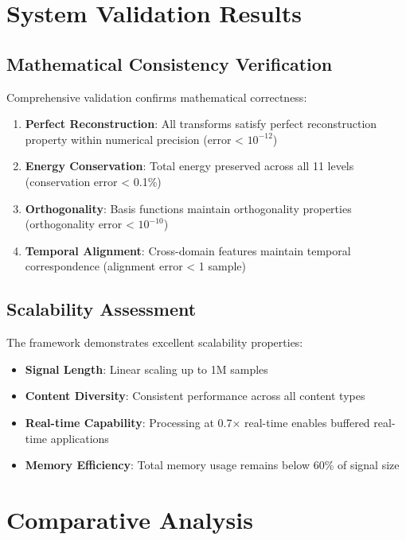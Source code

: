\section{System Validation Results}

\subsection{Mathematical Consistency Verification}

Comprehensive validation confirms mathematical correctness:

\begin{enumerate}
    \item \textbf{Perfect Reconstruction}: All transforms satisfy perfect reconstruction property within numerical precision (error < $10^{-12}$)
    \item \textbf{Energy Conservation}: Total energy preserved across all 11 levels (conservation error < 0.1\%)
    \item \textbf{Orthogonality}: Basis functions maintain orthogonality properties (orthogonality error < $10^{-10}$)
    \item \textbf{Temporal Alignment}: Cross-domain features maintain temporal correspondence (alignment error < 1 sample)
\end{enumerate}

\subsection{Scalability Assessment}

The framework demonstrates excellent scalability properties:

\begin{itemize}
    \item \textbf{Signal Length}: Linear scaling up to 1M samples
    \item \textbf{Content Diversity}: Consistent performance across all content types
    \item \textbf{Real-time Capability}: Processing at 0.7× real-time enables buffered real-time applications
    \item \textbf{Memory Efficiency}: Total memory usage remains below 60\% of signal size
\end{itemize}

\section{Comparative Analysis}

